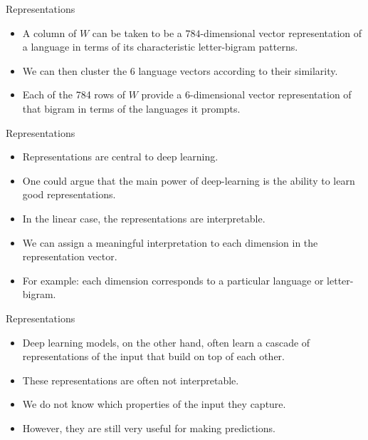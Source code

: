 \documentclass[handout]{beamer}
\begin{document}
\begin{frame}{Representations}

\begin{scriptsize}
\begin{itemize}
\item A column of $W$ can be taken to be a $784$-dimensional vector representation of a language in terms of its characteristic letter-bigram patterns.
\item We can then cluster the 6 language vectors according to their similarity.
\item Each of the 784 rows of $W$ provide a 6-dimensional vector representation of that bigram in terms of the languages it prompts.

\end{itemize}
\end{scriptsize}
\end{frame}


\begin{frame}{Representations}

\begin{scriptsize}
\begin{itemize}
\item Representations are central to deep learning.
\item One could argue that the main power of deep-learning is the ability to learn good representations.
\item In the linear case, the representations are interpretable.
\item We can assign a meaningful interpretation to each dimension in the
representation vector.
\item For example: each dimension corresponds to a particular language or letter-bigram.
\end{itemize}
\end{scriptsize}
\end{frame}


\begin{frame}{Representations}

\begin{scriptsize}
\begin{itemize}
\item Deep learning models, on the other hand,  often learn a cascade of representations of the input that build on top of each other. 
\item These representations are often not interpretable.
\item We do not know which properties of the input they capture.
\item However, they are still very useful for making predictions.
\end{itemize}
\end{scriptsize}
\end{frame}
\end{document}
